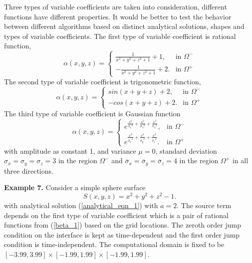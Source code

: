 \documentclass[dissertation]{uathesis}
\begin{document}
\begin{body}
Three types of variable coefficients are taken into consideration, different functions have different properties. It would be better to test the behavior between different algorithms based on distinct analytical solutions, shapes and types of variable coefficients. The first type of variable coefficient is rational function, 
\begin{equation} \label{beta_1}
\alpha(x, y, z)= 
\begin{cases}
\frac{1}{x^2 + y^2 + z^2 + 1} + 1,  &\mbox{in } \Omega^{-} \\
-\frac{1}{x^2 + y^2 + z^2 + 1} + 2.  &\mbox{in } \Omega^{+}
\end{cases}
\end{equation}
The second type of variable coefficient is trigonometric function,
\begin{equation} \label{beta_2}
\alpha(x, y, z)= 
\begin{cases}
sin(x + y + z) +2,   &\mbox{in } \Omega^{-} \\
-cos(x + y + z) + 2.  &\mbox{in } \Omega^{+}
\end{cases}
\end{equation}
The third type of variable coefficient is Gaussian function
\begin{equation} \label{beta_3}
\alpha(x, y, z)= 
\begin{cases}
e^{\frac{x^2}{{\sigma_x}^2} + \frac{x^2}{{\sigma_x}^2} + \frac{x^2}{{\sigma_x}^2}},  &\mbox{in } \Omega^{-} \\
e^{\frac{x^2}{{\overline{\sigma}_x}^2} + \frac{x^2}{{\overline{\sigma}_y}^2} + \frac{x^2}{{\overline{\sigma}_z}^2}}.  &\mbox{in } \Omega^{+}
\end{cases}
\end{equation}
with amplitude as constant 1, and variance $\mu = 0$, standard deviation $\sigma_x=\sigma_y=\sigma_z=3$ in the region $\Omega^{-}$ and ${\overline{\sigma}_x}={\overline{\sigma}_y}={\overline{\sigma}_z}=4$ in the region $\Omega^{+}$ in all three directions.

{\flushleft \bf Example 7.} Consider a simple sphere surface
% 
\begin{equation} \label{sphere}
S(x,y,z) = x^{2} + y^{2} + z^{2} -1.
\end{equation}
%
with analytical solution (\ref{analytical_eqn_1}) with $a=2$. The source term depends on the first type of variable coefficient which is a pair of rational functions from (\ref{beta_1}) based on the grid locations. The zeroth order jump condition on the interface is kept as time-dependent and the first order jump condition is time-independent. The computational domain is fixed to be $[-3.99,3.99]\times[-1.99,1.99]\times[-1.99,1.99]$. 


\end{body}
\end{document}
